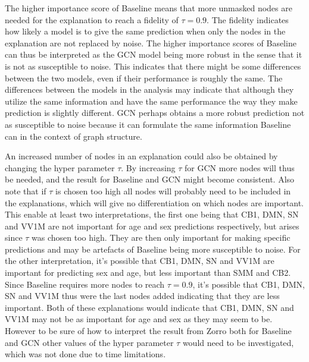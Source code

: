 The higher importance score of Baseline means that more unmasked nodes are needed for the explanation to reach a fidelity of $\tau = 0.9$. The fidelity indicates how likely a model is to give the same prediction when only the nodes in the explanation are not replaced by noise. The higher importance scores of Baseline can thus be interpreted as the GCN model being more robust in the sense that it is not as susceptible to noise. This indicates that there might be some differences between the two models, even if their performance is roughly the same. The differences between the models in the analysis may indicate that although they utilize the same information and have the same performance the way they make prediction is slightly different. GCN perhaps obtains a more robust prediction not as susceptible to noise because it can formulate the same information Baseline can in the context of graph structure. 

An increased number of nodes in an explanation could also be obtained by changing the hyper parameter $\tau$. By increasing $\tau$ for GCN more nodes will thus be needed, and the result for Baseline and GCN might become consistent. Also note that if $\tau$ is chosen too high all nodes will probably need to be included in the explanations, which will give no differentiation on which nodes are important. This enable at least two interpretations, the first one being that CB1, DMN, SN and VV1M are not important for age and sex predictions respectively, but arises since $\tau$ was chosen too high. They are then only important for making specific predictions and may be artefacts of Baseline being more susceptible to noise. For the other interpretation, it's possible that CB1, DMN, SN and VV1M are important for predicting sex and age, but less important than SMM and CB2. Since Baseline requires more nodes to reach $\tau = 0.9$, it's possible that CB1, DMN, SN and VV1M thus were the last nodes added indicating that they are less important. Both of these explanations would indicate that CB1, DMN, SN and VV1M may not be as important for age and sex as they may seem to be. However to be sure of how to interpret the result from Zorro both for Baseline and GCN other values of the hyper parameter $\tau$ would need to be investigated, which was not done due to time limitations. 


